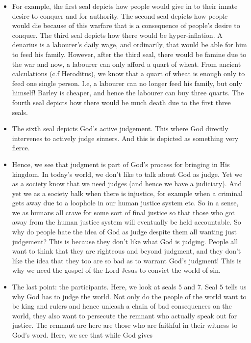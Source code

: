 \begin{itemize}
{  letting sinners do what they like.  }
  \item{For example, the first seal depicts how people would give in to their
  innate desire to conquer and for authority.  The second seal depicts how
  people would die because of this warfare that is a consequence of people's
  desire to conquer.  The third seal depicts how there would be
  hyper-inflation.  A denarius is a labourer's daily wage, and ordinarily,
  that would be able for him to feed his family.  However, after the third
  seal, there would be famine due to the war and now, a labourer can only
  afford a quart of wheat.  From ancient calculations (c.f Heroditus), we
  know that a quart of wheat is enough only to feed one single person.  I.e,
  a labourer can no longer feed his family, but only himself!  Barley is
  cheaper, and hence the labourer can buy three quarts.  The fourth seal
  depicts how there would be much death due to the first three seals.}
  \item{The sixth seal depicts God's active judgement.  This where God
  directly intervenes to actively judge sinners.  And this is depicted as
  something very fierce.}
  \item{Hence, we see that judgment is part of God's process for bringing in
  His kingdom.  In today's world, we don't like to talk about God as judge.
  Yet we as a society know that we need judges (and hence we have a
  judiciary).  And yet we as a society balk when there is injustice, for
  example when a criminal gets away due to a loophole in our human justice
  system etc.  So in a sense, we as humans all crave for some sort of final
  justice so that those who got away from the human justice system will
  eventually be held accountable.  So why do people hate the idea of God as
  judge despite them all wanting just judgement?  This is because they don't
  like what God is judging.  People all want to think that they are righteous
  and beyond judgment, and they don't like the idea that they too are so bad
  as to warrant God's judgment!  This is why we need the gospel of the Lord
  Jesus to convict the world of sin.}
  \item{The last point: the participants.  Here, we look at seals $5$ and
  $7$.  Seal $5$ tells us why God has to judge the world.  Not only do the
  people of the world want to be king and rulers and hence unleash a chain of
  bad consequences on the world, they also want to persecute the remnant who
  actually speak out for justice.  The remnant are here are those who are
  faithful in their witness to God's word.  Here, we see that while God gives
}
\end{itemize}
